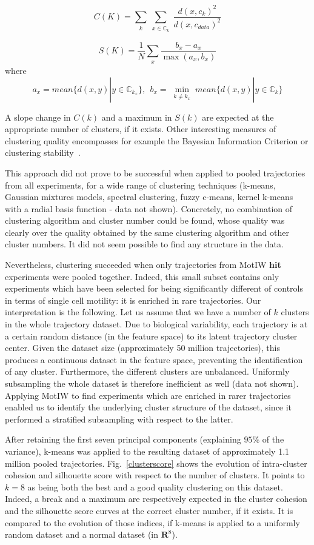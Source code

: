 \[
C(K) = \sum_{\substack{k}} \sum_{\substack{x \in \mathbb{C}_k}} \dfrac{d(x, c_k)^2}{d(x, c_{data})^2}\]

\[
S(K) = \dfrac{1}{N} \sum_{\substack{x}} \dfrac{b_x-a_x}{\max (a_x, b_x)}\]
where \[ a_x = mean \{d(x,y) | y \in \mathbb{C}_{k_x} \},\ \ b_x = \min_{\substack{k\neq k_x}} mean \{d(x,y) | y \in \mathbb{C}_k \}
\]

A slope change in $C(k)$ and a maximum in $S(k)$ are expected at the appropriate number of clusters, if it exists. Other interesting measures of clustering quality encompasses for example the Bayesian Information Criterion or clustering stability~\cite{pmid11928511}.

This approach did not prove to be successful when applied to pooled trajectories from all experiments, for a wide range of clustering techniques (k-means, Gaussian mixtures models, spectral clustering, fuzzy c-means, kernel k-means with a radial basis function - data not shown). Concretely, no combination of clustering algorithm and cluster number could be found, whose quality was clearly over the quality obtained by the same clustering algorithm and other cluster numbers. It did not seem possible to find any structure in the data.

Nevertheless, clustering succeeded when only trajectories from MotIW \textbf{hit} experiments were pooled together. Indeed, this small subset contains only experiments which have been selected for being significantly different of controls in terms of single cell motility: it is enriched in rare trajectories. Our interpretation is the following. Let us assume that we have a number of $k$ clusters in the whole trajectory dataset. Due to biological variability, each trajectory is at a certain random distance (in the feature space) to its latent trajectory cluster center. Given the dataset size (approximately 50 million trajectories), this produces a continuous dataset in the feature space, preventing the identification of any cluster. Furthermore, the different clusters are unbalanced. Uniformly subsampling the whole dataset is therefore inefficient as well (data not shown). Applying MotIW to find experiments which are enriched in rarer trajectories enabled us to identify the underlying cluster structure of the dataset, since it performed a stratified subsampling with respect to the latter.

 After retaining the first seven principal components (explaining $95\%$ of the variance), k-means was applied to the resulting dataset of approximately 1.1 million pooled trajectories. Fig.~\ref{clusterscore} shows the evolution of intra-cluster cohesion and silhouette score with respect to the number of clusters. It points to $k=8$ as being both the best and a good quality clustering on this dataset. Indeed, a break and a maximum are respectively expected in the cluster cohesion and the silhouette score curves at the correct cluster number, if it exists. It is compared to the evolution of those indices, if k-means is applied to a uniformly random dataset and a normal dataset (in $\mathbf{R}^8$). 

